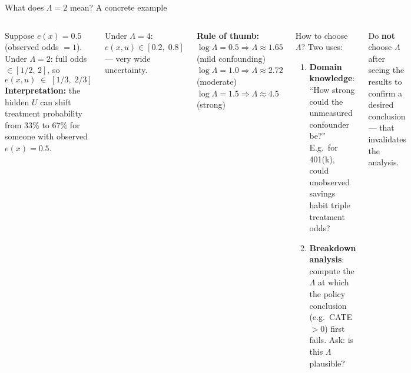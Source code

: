 \documentclass[aspectratio=169]{beamer}
\begin{document}
\begin{frame}{What does $\Lambda = 2$ mean? A concrete example}

\begin{columns}
Suppose $e(x) = 0.5$ (observed odds $= 1$).\\[4pt]
Under $\Lambda = 2$: full odds $\in [1/2,\, 2]$, so
\[
  e(x,u) \;\in\; [1/3,\; 2/3]
\]
\textbf{Interpretation:} the hidden $U$ can shift treatment probability from 33\% to 67\% for someone with observed $e(x)=0.5$.

\medskip
Under $\Lambda = 4$: $e(x,u) \in [0.2,\; 0.8]$ — very wide uncertainty.

\medskip
\textbf{Rule of thumb:}\\
$\log\Lambda = 0.5 \Rightarrow \Lambda \approx 1.65$ (mild confounding)\\
$\log\Lambda = 1.0 \Rightarrow \Lambda \approx 2.72$ (moderate)\\
$\log\Lambda = 1.5 \Rightarrow \Lambda \approx 4.5$ (strong)

\begin{block}{How to choose $\Lambda$?}
Two uses:
\begin{enumerate}
  \item \textbf{Domain knowledge}: ``How strong could the unmeasured confounder be?'' E.g.\ for 401(k), could unobserved savings habit triple treatment odds?
  \item \textbf{Breakdown analysis}: compute the $\Lambda$ at which the policy conclusion (e.g.\ CATE $> 0$) first fails. Ask: is this $\Lambda$ plausible?
\end{enumerate}
\end{block}

\vspace{0.2em}
\small Do \textbf{not} choose $\Lambda$ after seeing the results to confirm a desired conclusion --- that invalidates the analysis.
\end{columns}
\end{frame}

\end{document}
